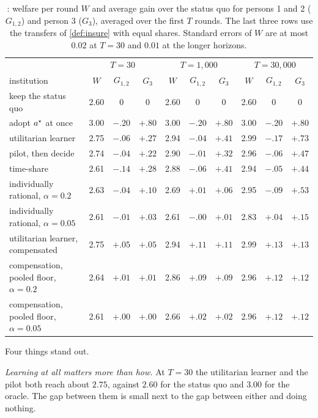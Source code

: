 \begin{table}[h]\centering\small
\begin{tabular}{l ccc ccc ccc}
\toprule
& \multicolumn{3}{c}{$T=30$} & \multicolumn{3}{c}{$T=1{,}000$} & \multicolumn{3}{c}{$T=30{,}000$}\\
institution & $W$ & $G_{1,2}$ & $G_3$ & $W$ & $G_{1,2}$ & $G_3$ & $W$ & $G_{1,2}$ & $G_3$\\
\midrule
keep the status quo & 2.60 & $0$ & $0$ & 2.60 & $0$ & $0$ & 2.60 & $0$ & $0$\\
adopt $a^\star$ at once & 3.00 & $-.20$ & $+.80$ & 3.00 & $-.20$ & $+.80$ & 3.00 & $-.20$ & $+.80$\\
utilitarian learner & 2.75 & $-.06$ & $+.27$ & 2.94 & $-.04$ & $+.41$ & 2.99 & $-.17$ & $+.73$\\
pilot, then decide & 2.74 & $-.04$ & $+.22$ & 2.90 & $-.01$ & $+.32$ & 2.96 & $-.06$ & $+.47$\\
time-share & 2.61 & $-.14$ & $+.28$ & 2.88 & $-.06$ & $+.41$ & 2.94 & $-.05$ & $+.44$\\
individually rational, $\alpha=0.2$ & 2.63 & $-.04$ & $+.10$ & 2.69 & $+.01$ & $+.06$ & 2.95 & $-.09$ & $+.53$\\
individually rational, $\alpha=0.05$ & 2.61 & $-.01$ & $+.03$ & 2.61 & $-.00$ & $+.01$ & 2.83 & $+.04$ & $+.15$\\
\midrule
utilitarian learner, compensated & 2.75 & $+.05$ & $+.05$ & 2.94 & $+.11$ & $+.11$ & 2.99 & $+.13$ & $+.13$\\
compensation, pooled floor, $\alpha=0.2$ & 2.64 & $+.01$ & $+.01$ & 2.86 & $+.09$ & $+.09$ & 2.96 & $+.12$ & $+.12$\\
compensation, pooled floor, $\alpha=0.05$ & 2.61 & $+.00$ & $+.00$ & 2.66 & $+.02$ & $+.02$ & 2.96 & $+.12$ & $+.12$\\
\bottomrule
\end{tabular}
\caption{: welfare per round $W$ and average gain over the status quo for persons 1 and 2 ($G_{1,2}$) and person 3 ($G_3$), averaged over the first $T$ rounds. The last three rows use the transfers of \cref{def:insure} with equal shares. Standard errors of $W$ are at most $0.02$ at $T=30$ and $0.01$ at the longer horizons.}
\label{tab:scoreT}
\end{table}

Four things stand out.

\emph{Learning at all matters more than how.} At $T=30$ the utilitarian learner and the pilot both reach about $2.75$, against $2.60$ for the status quo and $3.00$ for the oracle. The gap between them is small next to the gap between either and doing nothing.


